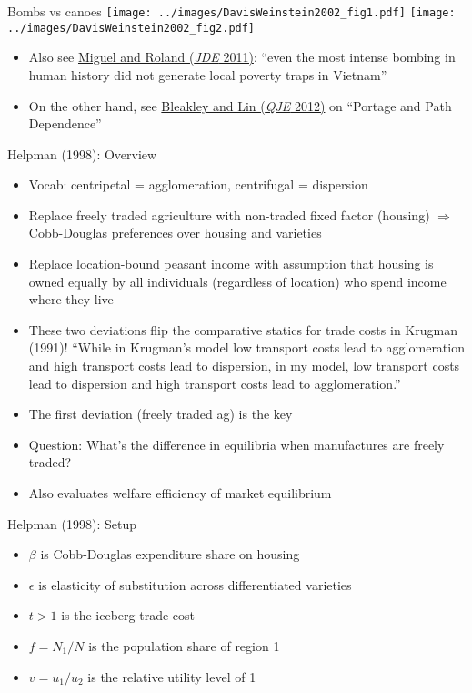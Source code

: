 \documentclass[10pt,notes=hide]{beamer}
\begin{document}
\begin{frame}{Bombs vs canoes}
\texttt{[image: ../images/DavisWeinstein2002\_fig1.pdf]}
\texttt{[image: ../images/DavisWeinstein2002\_fig2.pdf]}
\begin{itemize}
	\item  Also see \href{https://www.sciencedirect.com/science/article/pii/S0304387810000817}{Miguel and Roland (\textit{JDE} 2011)}: ``even the most intense bombing in human history did not generate local poverty traps in Vietnam''
	\item On the other hand, see \href{https://academic.oup.com/qje/article-abstract/127/2/587/1825072}{Bleakley and Lin (\textit{QJE} 2012)} on ``Portage and Path Dependence''
\end{itemize}
\end{frame}
\begin{frame}{Helpman (1998): Overview}
\begin{itemize}
	\item Vocab: centripetal = agglomeration, centrifugal  = dispersion
	\item Replace freely traded agriculture with non-traded fixed factor (housing) $\Rightarrow$ Cobb-Douglas preferences over housing and varieties
	\item Replace location-bound peasant income with assumption that housing is owned equally by all individuals (regardless of location) who spend income where they live
	\item These two deviations flip the comparative statics for trade costs in Krugman (1991)! ``While in Krugman's model low transport costs lead to agglomeration and high transport costs lead to dispersion, in my model, low transport costs lead to dispersion and high transport costs lead to agglomeration.''
	\item The first deviation (freely traded ag) is the key
	\item Question: What's the difference in equilibria when manufactures are freely traded?
	\item Also evaluates welfare efficiency of market equilibrium
\end{itemize}
\end{frame}
\begin{frame}{Helpman (1998): Setup}
\begin{itemize}
	\item $\beta$ is Cobb-Douglas expenditure share on housing
	\item $\epsilon$ is elasticity of substitution across differentiated varieties
	\item $t>1$ is the iceberg trade cost
	\item $f = N_1 / N$ is the population share of region 1
	\item $v = u_1 / u_2 $ is the relative utility level of 1
\end{itemize}
\end{frame}
\end{document}

